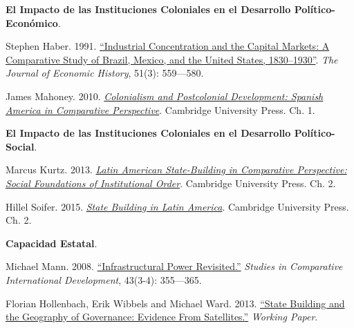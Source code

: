 \documentclass[letterpaper]{article}
\renewenvironment{itemize}{
  \begin{list}{}{
    \setlength{\leftmargin}{1.5em}
  }
}{
  \end{list}
}
\begin{document}
\begin{enumerate}[label=\roman*.]
\begin{itemize}
		\item[6.] {\bf El Impacto de las Instituciones Coloniales en el Desarrollo Pol\'itico-Econ\'omico}.
				\begin{itemize}
					\item[$\circ$] Stephen Haber. 1991. \href{https://github.com/hbahamonde/Ciencia_Politica_II/raw/master/Readings/Haber.pdf}{``Industrial Concentration and the Capital Markets: A Comparative Study of Brazil, Mexico, and the United States, 1830–1930''}. \emph{The Journal of Economic History}, 51(3): 559---580. 
					\item[$\circ$]  James Mahoney. 2010. \href{https://github.com/hbahamonde/Ciencia_Politica_II/raw/master/Readings/Mahoney_Colonialism_PostColonialsm.pdf}{\emph{Colonialism and Postcolonial Development: Spanish America in Comparative Perspective}}. Cambridge University Press. Ch. 1. 
				\end{itemize}

		\item[7.] {\bf El Impacto de las Instituciones Coloniales en el Desarrollo Pol\'itico-Social}.
				\begin{itemize}
					\item[$\circ$]  Marcus Kurtz. 2013. \href{https://github.com/hbahamonde/Ciencia_Politica_II/raw/master/Readings/Kurtz_2013.pdf}{\emph{Latin American State-Building in Comparative Perspective: Social Foundations of Institutional Order}}. Cambridge University Press. Ch. 2.
					\item[$\circ$]  Hillel Soifer. 2015. \href{https://github.com/hbahamonde/Ciencia_Politica_II/raw/master/Readings/Soifer.pdf}{\emph{State Building in Latin America}}. Cambridge University Press. Ch. 2.
				\end{itemize}

			\item[8.] {\bf Capacidad Estatal}.
				\begin{itemize}
					\item[$\circ$] Michael Mann. 2008. \href{https://github.com/hbahamonde/Ciencia_Politica_II/raw/master/Readings/Mann_2008.pdf}{``Infrastructural Power Revisited.''} \emph{Studies in Comparative International Development}, 43(3-4): 355---365. 
					\item[$\circ$]  Florian Hollenbach, Erik Wibbels and Michael Ward. 2013. \href{https://github.com/hbahamonde/Ciencia_Politica_II/raw/master/Readings/Hollenbach_2013.pdf}{``State Building and the Geography of Governance: Evidence From Satellites.''} \emph{Working Paper}. 
				\end{itemize}


\end{itemize}
\end{enumerate}
\end{document}
